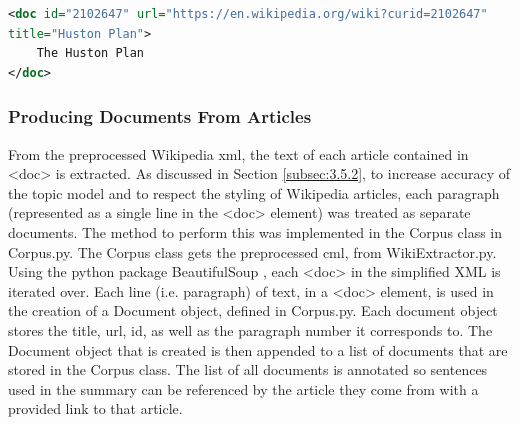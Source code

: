 \begin{lstlisting}[language=XML]
<doc id="2102647" url="https://en.wikipedia.org/wiki?curid=2102647" 
title="Huston Plan">
    The Huston Plan
</doc>
\end{lstlisting}

\subsubsection{Producing Documents From Articles}
From the preprocessed Wikipedia xml, the text of each article contained in <doc> is extracted. As discussed in Section \ref{subsec:3.5.2}, to increase accuracy of the topic model and to respect the styling of Wikipedia articles, each paragraph (represented as a single line in the <doc> element) was treated as separate documents. The method to perform this was implemented in the Corpus class in Corpus.py. The Corpus class gets the preprocessed cml, from WikiExtractor.py. Using the python package BeautifulSoup \citep{richardson2007beautiful}, each <doc> in the simplified XML is iterated over. Each line (i.e. paragraph) of text, in a <doc> element, is used in the creation of a Document object, defined in Corpus.py. Each document object stores the title, url, id, as well as the paragraph number it corresponds to. The Document object that is created is then appended to a list of documents that are stored in the Corpus class. The list of all documents is annotated so sentences used in the summary can be referenced by the article they come from with a provided link to that article.

